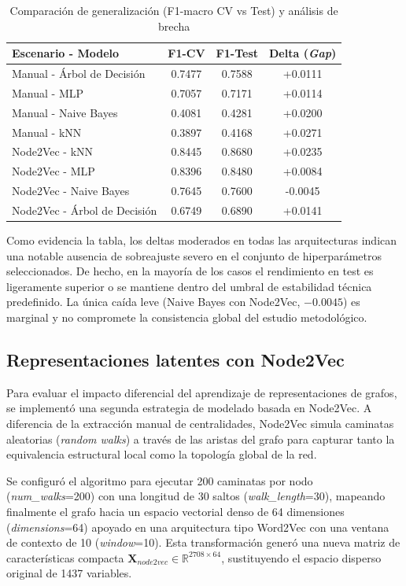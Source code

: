 \documentclass[conference,a4paper]{IEEEtran}
\begin{document}
\begin{table}[htbp]
\caption{Comparación de generalización (F1-macro CV vs Test) y análisis de brecha}
\centering
\begin{tabular}{lccc}
\toprule
Escenario - Modelo & F1-CV & F1-Test & Delta (\textit{Gap}) \\
\midrule
Manual - Árbol de Decisión & 0.7477 & 0.7588 & +0.0111 \\
Manual - MLP & 0.7057 & 0.7171 & +0.0114 \\
Manual - Naive Bayes & 0.4081 & 0.4281 & +0.0200 \\
Manual - kNN & 0.3897 & 0.4168 & +0.0271 \\
\midrule
Node2Vec - kNN & 0.8445 & 0.8680 & +0.0235 \\
Node2Vec - MLP & 0.8396 & 0.8480 & +0.0084 \\
Node2Vec - Naive Bayes & 0.7645 & 0.7600 & -0.0045 \\
Node2Vec - Árbol de Decisión & 0.6749 & 0.6890 & +0.0141 \\
\bottomrule
\end{tabular}
\label{tab:cv-test}
\end{table}

Como evidencia la tabla, los deltas moderados en todas las arquitecturas indican una notable ausencia de sobreajuste severo en el conjunto de hiperparámetros seleccionados. De hecho, en la mayoría de los casos el rendimiento en test es ligeramente
superior o se mantiene dentro del umbral de estabilidad técnica predefinido. La única caída leve (Naive Bayes con Node2Vec, $-0.0045$) es marginal y no compromete la consistencia global del estudio metodológico.

\subsection{Representaciones latentes con Node2Vec}

Para evaluar el impacto diferencial del aprendizaje de representaciones de grafos, se implementó una segunda estrategia de modelado basada en Node2Vec. A diferencia de la extracción manual de centralidades, Node2Vec simula caminatas aleatorias 
(\textit{random walks}) a través de las aristas del grafo para capturar tanto la equivalencia estructural local como la topología global de la red.

Se configuró el algoritmo para ejecutar 200 caminatas por nodo (\textit{num\_walks}=200) con una longitud de 30 saltos (\textit{walk\_length}=30), mapeando finalmente el grafo hacia un espacio vectorial denso de 64 dimensiones
(\textit{dimensions}=64) apoyado en una arquitectura tipo Word2Vec con una ventana de contexto de 10 (\textit{window}=10). Esta transformación generó una nueva matriz de características compacta
$\mathbf{X}_{node2vec} \in \mathbb{R}^{2708 \times 64}$, sustituyendo el espacio disperso original de 1437 variables.
\end{document}
